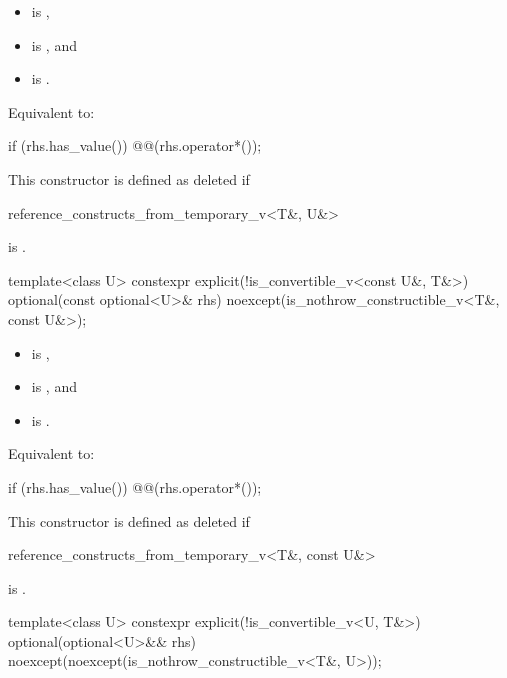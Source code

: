 \begin{itemdescr}
\pnum
\constraints
\begin{itemize}
\item {} is ,
\item {} is , and
\item {} is .
\end{itemize}

\pnum
\effects
Equivalent to:
\begin{codeblock}
if (rhs.has_value()) @@(rhs.operator*());
\end{codeblock}

\pnum
\remarks
This constructor is defined as deleted if
\begin{codeblock}
reference_constructs_from_temporary_v<T&, U&>
\end{codeblock}
is .
\end{itemdescr}

%
\begin{itemdecl}
template<class U>
  constexpr explicit(!is_convertible_v<const U&, T&>)
      optional(const optional<U>& rhs) noexcept(is_nothrow_constructible_v<T&, const U&>);
\end{itemdecl}

\begin{itemdescr}
\pnum
\constraints
\begin{itemize}
\item {} is ,
\item {} is , and
\item {} is .
\end{itemize}

\pnum
\effects
Equivalent to:
\begin{codeblock}
if (rhs.has_value()) @@(rhs.operator*());
\end{codeblock}

\pnum
\remarks
This constructor is defined as deleted if
\begin{codeblock}
reference_constructs_from_temporary_v<T&, const U&>
\end{codeblock}
is .
\end{itemdescr}

%
\begin{itemdecl}
template<class U>
  constexpr explicit(!is_convertible_v<U, T&>)
      optional(optional<U>&& rhs) noexcept(noexcept(is_nothrow_constructible_v<T&, U>));
\end{itemdecl}


